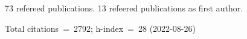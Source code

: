 73 refereed publications. 13 refeered publications as first author.

Total citations~=~2792; h-index~=~28 (2022-08-26)